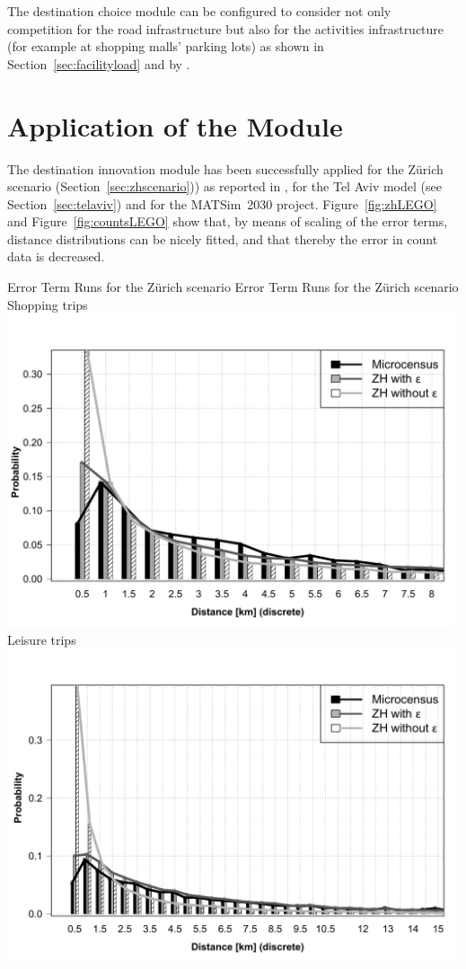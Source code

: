The destination choice module can be configured to consider not only competition for the road infrastructure but also for the activities infrastructure (for example at shopping malls' parking lots) as shown in Section~\ref{sec:facilityload} and by \citet[][]{HorniEtAl_TRR_2009}.

\section{Application of the Module}
The destination innovation module has been successfully applied for the Zürich scenario (Section~\ref{sec:zhscenario})) as reported in \citet[][p.99]{Horni_PhDThesis_2013}, for the Tel Aviv model (see Section~\ref{sec:telaviv}) and for the MATSim~2030 project. Figure~\ref{fig:zhLEGO} and Figure~\ref{fig:countsLEGO} show that, by means of scaling of the error terms, distance distributions can be nicely fitted, and that thereby the error in count data is decreased.

\createfigure%
{Error Term Runs for the Zürich scenario}%
{Error Term Runs for the Zürich scenario}%
{\label{fig:zhLEGO}}%
{%
  \createsubfigure%
  {Shopping trips}%
	{\includegraphics[width=0.99\textwidth,angle=0]{extending/figures/dc/zhShopping.pdf}}%
  {\label{fig:zhShopping}}%
  {}%
   \createsubfigure%
  {Leisure trips}%
  {\includegraphics[width=0.99\textwidth,angle=0]{extending/figures/dc//zhLeisure.pdf}}%
  {\label{fig:zhLeisure}}%
  {}%
}%
{}

